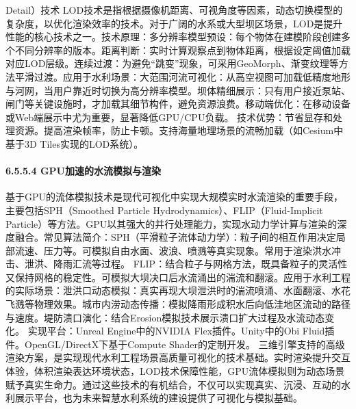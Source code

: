{{{{{{{{{{{Detail）技术}\label{lodlevel-of-detailux6280ux672f}
LOD技术是指根据摄像机距离、可视角度等因素，动态切换模型的复杂度，以优化渲染效率的技术。对于广阔的水系或大型坝区场景，LOD是提升性能的核心技术之一。技术原理：多分辨率模型预设：每个物体在建模阶段创建多个不同分辨率的版本。距离判断：实时计算观察点到物体距离，根据设定阈值加载对应LOD层级。连续过渡：为避免``跳变''现象，可采用GeoMorph、渐变纹理等方法平滑过渡。应用于水利场景：大范围河流可视化：从高空视图可加载低精度地形与河网，当用户靠近时切换为高分辨率模型。坝体精细展示：只有用户接近泵站、闸门等关键设施时，才加载其细节构件，避免资源浪费。移动端优化：在移动设备或Web端展示中尤为重要，显著降低GPU/CPU负载。
技术优势：节省显存和处理资源。提高渲染帧率，防止卡顿。支持海量地理场景的流畅加载（如Cesium中基于3D Tiles实现的LOD系统）。 \paragraph{6.5.5.4
GPU加速的水流模拟与渲染}\label{gpuux52a0ux901fux7684ux6c34ux6d41ux6a21ux62dfux4e0eux6e32ux67d3}
基于GPU的流体模拟技术是现代可视化中实现大规模实时水流渲染的重要手段，主要包括SPH（Smoothed Particle Hydrodynamics）、FLIP（Fluid-Implicit
Particle）等方法。GPU以其强大的并行处理能力，实现水动力学计算与渲染的深度融合。常见算法简介：SPH（平滑粒子流体动力学）：粒子间的相互作用决定局部流速、压力等。可模拟自由水面、波浪、喷溅等真实现象。常用于渲染洪水冲击、泄洪、降雨汇流等过程。
FLIP：结合粒子与网格方法，既具备粒子的灵活性又保持网格的稳定性。可模拟大坝决口后水流涌出的湍流和翻滚。应用于水利工程的实际场景：泄洪口动态模拟：真实再现大坝泄洪时的湍流喷涌、水面翻滚、水花飞溅等物理效果。城市内涝动态传播：模拟降雨形成积水后向低洼地区流动的路径与速度。堤防溃口演化：结合Erosion模拟技术展示溃口扩大过程及水流动态变化。
实现平台：Unreal Engine中的NVIDIA Flex插件。Unity中的Obi Fluid插件。OpenGL/DirectX下基于Compute Shader的定制开发。
三维引擎支持的高级渲染方案，是实现现代水利工程场景高质量可视化的技术基础。实时渲染提升交互体验，体积渲染表达环境状态，LOD技术保障性能，GPU流体模拟则为动态场景赋予真实生命力。通过这些技术的有机结合，不仅可以实现真实、沉浸、互动的水利展示平台，也为未来智慧水利系统的建设提供了可视化与模拟基础。
}}}}}}}}}}
